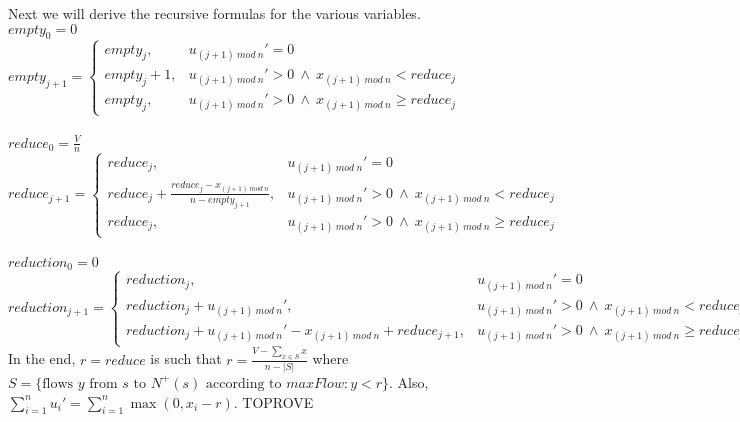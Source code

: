 \documentclass[11pt]{llncs}
\begin{document}
       Next we will derive the recursive formulas for the various variables. \\
       $empty_0 = 0$ \\
       $empty_{j+1} = 
          \begin{cases}
             empty_j, & u_{(j+1)\:mod\:n}' = 0 \\
             empty_j+1, & u_{(j+1)\:mod\:n}' > 0 \: \wedge \: x_{(j+1) \:mod\:n} < reduce_j \\
             empty_j, & u_{(j+1)\:mod\:n}' > 0 \: \wedge \: x_{(j+1) \:mod\:n} \geq reduce_j
          \end{cases}$ \\ \ \\
       $reduce_0 = \frac{V}{n}$ \\
       $reduce_{j+1} =
          \begin{cases}
             reduce_j, & u_{(j+1)\:mod\:n}' = 0 \\
             reduce_j + \frac{reduce_j-x_{(j+1)\:mod\:n}}{n-empty_{j+1}}, & u_{(j+1)\:mod\:n}' > 0 \: \wedge \:
                x_{(j+1) \:mod\:n} < reduce_j \\
             reduce_j, & u_{(j+1)\:mod\:n}' > 0 \: \wedge \: x_{(j+1) \:mod\:n} \geq reduce_j
          \end{cases}$ \\ \ \\
       $reduction_0 = 0$ \\
       $reduction_{j+1} =
          \begin{cases}
             reduction_j, & u_{(j+1)\:mod\:n}' = 0 \\
             reduction_j + u_{(j+1)\:mod\:n}', & u_{(j+1)\:mod\:n}' > 0 \: \wedge \: x_{(j+1) \:mod\:n} < reduce_j \\
             reduction_j + u_{(j+1)\:mod\:n}' - x_{(j+1)\:mod\:n} + reduce_{j+1}, &
                u_{(j+1)\:mod\:n}' > 0 \: \wedge \: x_{(j+1) \:mod\:n} \geq reduce_j
          \end{cases}$ \\
       In the end, $r = reduce$ is such that $r = \frac{V - \sum\limits_{x \in S}x}{n - |S|}$ where
       $S = \{\text{flows } y \text{ from } s \text{ to } N^{+}(s) \text{ according to } maxFlow : y < r\}$. Also,
       $\sum\limits_{i=1}^{n}u_i' = \sum\limits_{i=1}^{n}\max{(0,x_i - r)}$. TOPROVE
\end{document}
